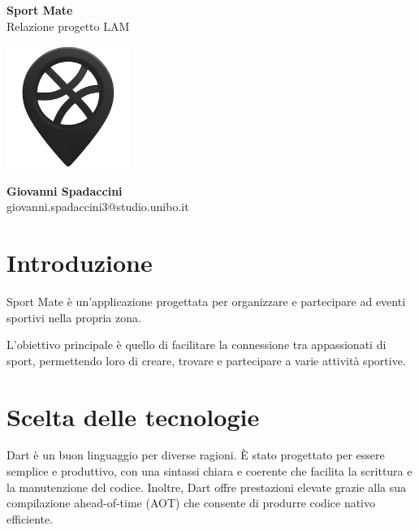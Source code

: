 \documentclass[a4paper,12pt]{article}
\begin{document}
\begin{titlepage}
    \begin{center}

        \vspace{3cm}
        \textbf{\Large Sport Mate}\\
        \vspace{0.5cm}
        {\large Relazione progetto LAM}
        
        \vspace{1cm}
        \includegraphics[width=0.3\textwidth]{img/logo.png}
         
        \vspace{3cm}
        \textbf{\Large Giovanni Spadaccini}\\
        \vspace{0.5cm}
        giovanni.spadaccini3@studio.unibo.it
        
        \vfill

    \end{center}
\end{titlepage}

\tableofcontents
\newpage

\section{Introduzione}

Sport Mate è un'applicazione progettata per organizzare e partecipare ad eventi sportivi nella propria zona.

L'obiettivo principale è quello di facilitare la connessione tra appassionati di sport, permettendo loro di creare, trovare e partecipare a varie attività sportive.

\section{Scelta delle tecnologie}

Dart è un buon linguaggio per diverse ragioni. È stato progettato per essere semplice e produttivo, con una sintassi chiara e coerente che facilita la scrittura e la manutenzione del codice.
Inoltre, Dart offre prestazioni elevate grazie alla sua compilazione ahead-of-time (AOT) che consente di produrre codice nativo efficiente.
\end{document}
